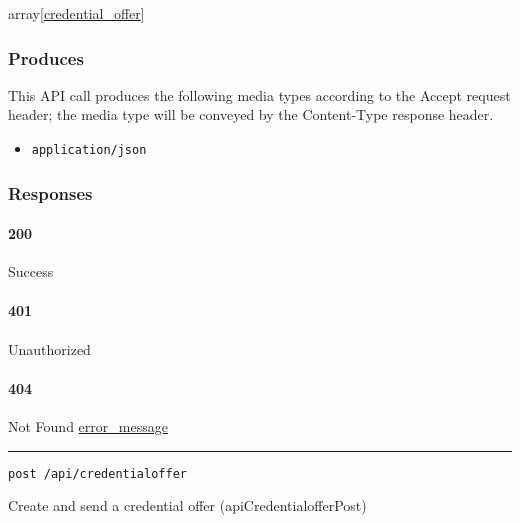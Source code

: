 array{[}\protect\hyperlink{credential_offer}{credential\_offer}{]}

\hypertarget{produces-66}{%
\subsubsection{Produces}\label{produces-66}}

This API call produces the following media types according to the
{Accept} request header; the media type will be conveyed by the
{Content-Type} response header.

\begin{itemize}
\tightlist
\item
  \texttt{application/json}
\end{itemize}

\hypertarget{responses-66}{%
\subsubsection{Responses}\label{responses-66}}

\hypertarget{section-219}{%
\paragraph{200}\label{section-219}}

Success

\hypertarget{section-220}{%
\paragraph{401}\label{section-220}}

Unauthorized \protect\hyperlink{}{}

\hypertarget{section-221}{%
\paragraph{404}\label{section-221}}

Not Found \protect\hyperlink{error_message}{error\_message}

\begin{center}\rule{0.5\linewidth}{\linethickness}\end{center}

\protect\hypertarget{apiCredentialofferPost}{}{}

\begin{verbatim}
post /api/credentialoffer
\end{verbatim}

Create and send a credential offer ({apiCredentialofferPost})

